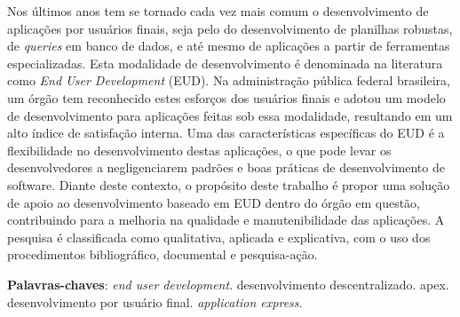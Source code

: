 \begin{resumo}

Nos últimos anos tem se tornado cada vez mais comum o desenvolvimento de aplicações por usuários finais, seja pelo do desenvolvimento de planilhas robustas, de \textit{queries} em banco de dados, e até mesmo de aplicações a partir de ferramentas especializadas. Esta modalidade de desenvolvimento é denominada na literatura como \textit{End User Development} (EUD). Na administração pública federal brasileira, um órgão tem reconhecido estes esforços dos usuários finais e adotou um modelo de desenvolvimento para aplicações feitas sob essa modalidade, resultando em um alto índice de satisfação interna. Uma das características específicas do EUD é a flexibilidade no desenvolvimento destas aplicações, o que pode levar os desenvolvedores a negligenciarem padrões e boas práticas de desenvolvimento de software. Diante deste contexto, o propósito deste trabalho é propor uma solução de apoio ao desenvolvimento baseado em EUD dentro do órgão em questão, contribuindo para a melhoria na qualidade e manutenibilidade das aplicações. A pesquisa é classificada como qualitativa, aplicada e explicativa, com o uso dos procedimentos bibliográfico, documental e pesquisa-ação.



 \vspace{\onelineskip}
    
 \noindent
 \textbf{Palavras-chaves}: \textit{end user development}. desenvolvimento descentralizado. apex. desenvolvimento por usuário final. \textit{application express}.
\end{resumo}
